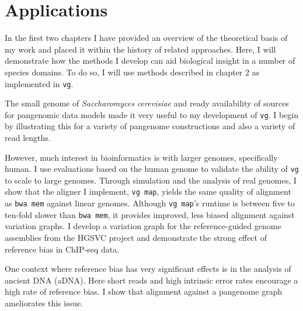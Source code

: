 \chapter{Applications}

\ifpdf
    \graphicspath{{Chapter3/Figs/Raster/}{Chapter3/Figs/PDF/}{Chapter3/Figs/}}
\else
    \graphicspath{{Chapter3/Figs/Vector/}{Chapter3/Figs/}}
\fi

In the first two chapters I have provided an overview of the theoretical basis of my work and placed it within the history of related approaches.
Here, I will demonstrate how the methods I develop can aid biological insight in a number of species domains.
To do so, I will use methods described in chapter 2 as implemented in {\tt vg}.

The small genome of \emph{Saccharomyces cerevisiae} and ready availability of sources for pangenomic data models made it very useful to my development of {\tt vg}.
I begin by illustrating this for a variety of pangenome constructions and also a variety of read lengths.

However, much interest in bioinformatics is with larger genomes, specifically human.
I use evaluations based on the human genome to validate the ability of {\tt vg} to scale to large genomes.
Through simulation and the analysis of real genomes, I show that the aligner I implement, {\tt vg map}, yields the same quality of alignment as {\tt bwa mem} against linear genomes.
Although {\tt vg map}'s runtime is between five to ten-fold slower than {\tt bwa mem}, it provides improved, less biased alignment against variation graphs.
I develop a variation graph for the reference-guided genome assemblies from the HGSVC project and demonstrate the strong effect of reference bias in ChIP-seq data.

One context where reference bias has very significant effects is in the analysis of ancient DNA (aDNA).
Here short reads and high intrinsic error rates encourage a high rate of reference bias.
I show that alignment against a pangenome graph ameliorates this issue.

